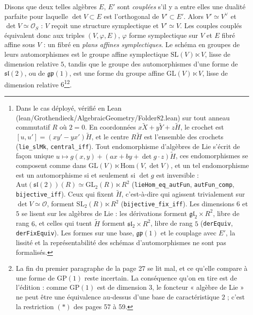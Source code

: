 \documentclass[11pt,a4paper]{article}
\begin{document}
Disons que deux telles algèbres $E$, $E'$ sont \emph{couplées} s'il y a entre elles
une dualité parfaite pour laquelle $\det V \subset E$ est l'orthogonal de
$V' \subset E'$. Alors $V' \simeq V^{\vee}$ et $\det V \simeq \mathcal{O}_S$ : $V$ reçoit une
structure symplectique et $V' \simeq V$. Les couples couplés équivalent donc aux
triples $(V, \varphi, E)$, $\varphi$ forme symplectique sur $V$ et $E$ fibré affine
sous $V$ : un fibré en \emph{plans affines symplectiques}. Le schéma en groupes de
leurs automorphismes est le groupe affine symplectique
$\mathrm{SL}(V) \ltimes V$, lisse de dimension relative $5$, tandis que le groupe
des automorphismes d'une forme de $\mathfrak{sl}(2)$, ou de $\mathfrak{gp}(1)$, est
une forme du groupe affine $\mathrm{GL}(V) \ltimes V$, lisse de dimension relative
$6$\footnote{Dans le cas déployé, vérifié en Lean (lean/Grothendieck/AlgebraicGeometry/Folder82.lean)
sur tout anneau commutatif $R$ où $2 = 0$. En coordonnées
$x\widetilde{X} + y\widetilde{Y} + z\widetilde{H}$, le crochet est
$[u, u'] = (xy' - yx')\widetilde{H}$, et le centre $R\widetilde{H}$ est l'ensemble
des crochets (\texttt{lie\_slMk}, \texttt{central\_iff}). Tout endomorphisme
d'algèbres de Lie s'écrit de façon unique $u \mapsto g(x, y) + (ax + by + \det
g \cdot z)\widetilde{H}$, ces endomorphismes se composent comme dans
$\mathrm{GL}(V) \ltimes \mathrm{Hom}(V, \det V)$, et un tel endomorphisme est
un automorphisme si et seulement si $\det g$ est inversible : $\mathrm{Aut}(
\mathfrak{sl}(2))(R) \simeq \mathrm{GL}_2(R) \ltimes R^2$
(\texttt{lieHom\_eq\_autFun}, \texttt{autFun\_comp}, \texttt{bijective\_iff}).
Ceux qui fixent $\widetilde{H}$, c'est-à-dire qui agissent trivialement sur
$\det V \simeq \mathcal{O}$, forment $\mathrm{SL}_2(R) \ltimes R^2$
(\texttt{bijective\_fix\_iff}). Les dimensions $6$ et $5$ se lisent sur les
algèbres de Lie : les dérivations forment $\mathfrak{gl}_2 \times R^2$, libre de
rang $6$, et celles qui tuent $\widetilde{H}$ forment $\mathfrak{sl}_2 \times R^2$,
libre de rang $5$ (\texttt{derEquiv}, \texttt{derFixEquiv}). Les formes sur une
base, $\mathfrak{gp}(1)$ et le couplage avec $E'$, la lissité et la
représentabilité des schémas d'automorphismes ne sont pas formalisés.}\footnote{La fin du premier paragraphe de la page 27 se lit mal, et ce qu'elle
compare à une forme de $\mathrm{GP}(1)$ reste incertain. La conséquence qu'on en
tire est de l'édition : comme $\mathrm{GP}(1)$ est de dimension $3$, le foncteur
« algèbre de Lie » ne peut être une équivalence au-dessus d'une base de
caractéristique $2$ ; c'est la restriction $(*)$ des pages 57 à 59.}.
\end{document}
